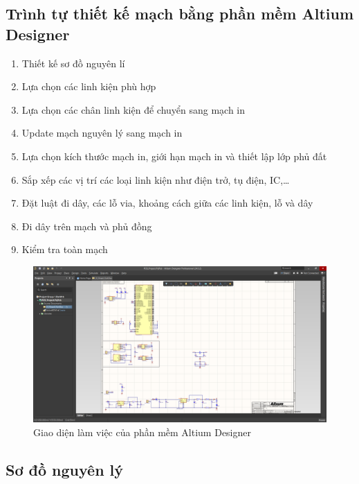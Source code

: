 \documentclass{article}
\begin{document}
\subsection{Trình tự thiết kế mạch bằng phần mềm Altium Designer}
\begin{enumerate}
    \item Thiết kế sơ đồ nguyên lí
    \item Lựa chọn các linh kiện phù hợp
    \item Lựa chọn các chân linh kiện để chuyển sang mạch in
    \item Update mạch nguyên lý sang mạch in
    \item Lựa chọn kích thước mạch in, giới hạn mạch in và thiết lập lớp phủ đất
    \item Sắp xếp các vị trí các loại linh kiện như điện trở, tụ điện, IC,…
    \item Đặt luật đi dây, các lỗ via, khoảng cách giữa các linh kiện, lỗ và dây
    \item Đi dây trên mạch và phủ đồng
    \item Kiểm tra toàn mạch
\end{enumerate}
\begin{figure}[H]
    \centering
    \includegraphics[width=1\textwidth]{image/workspacealtium.png}
    \caption{Giao diện làm việc của phần mềm Altium Designer}
    \label{fig:workspacealtium}
\end{figure}
\cleardoublepage
\subsection{Sơ đồ nguyên lý}
\end{document}
